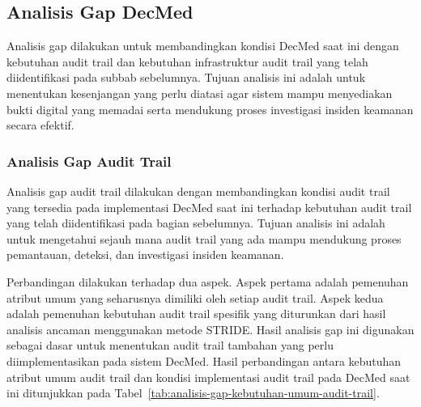 \subsection{Analisis Gap DecMed}

Analisis gap dilakukan untuk membandingkan kondisi DecMed saat ini dengan kebutuhan audit trail dan kebutuhan infrastruktur audit trail yang telah diidentifikasi pada subbab sebelumnya. Tujuan analisis ini adalah untuk menentukan kesenjangan yang perlu diatasi agar sistem mampu menyediakan bukti digital yang memadai serta mendukung proses investigasi insiden keamanan secara efektif.

\subsubsection{Analisis Gap Audit Trail}

Analisis gap audit trail dilakukan dengan membandingkan kondisi audit trail yang tersedia pada implementasi DecMed saat ini terhadap kebutuhan audit trail yang telah diidentifikasi pada bagian sebelumnya. Tujuan analisis ini adalah untuk mengetahui sejauh mana audit trail yang ada mampu mendukung proses pemantauan, deteksi, dan investigasi insiden keamanan.

Perbandingan dilakukan terhadap dua aspek. Aspek pertama adalah pemenuhan atribut umum yang seharusnya dimiliki oleh setiap audit trail. Aspek kedua adalah pemenuhan kebutuhan audit trail spesifik yang diturunkan dari hasil analisis ancaman menggunakan metode STRIDE. Hasil analisis gap ini digunakan sebagai dasar untuk menentukan audit trail tambahan yang perlu diimplementasikan pada sistem DecMed. Hasil perbandingan antara kebutuhan atribut umum audit trail dan kondisi implementasi audit trail pada DecMed saat ini ditunjukkan pada Tabel~\ref{tab:analisis-gap-kebutuhan-umum-audit-trail}.


